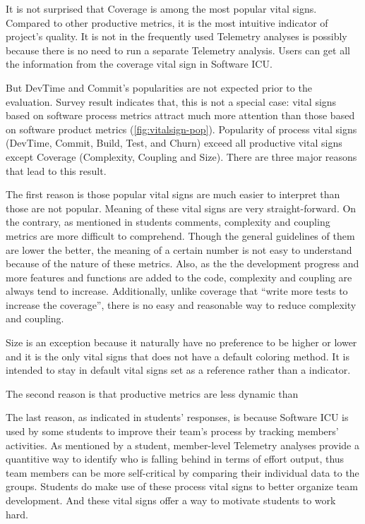 It is not surprised that Coverage is among the most popular vital signs. Compared to other productive metrics, it is the most intuitive indicator of project's quality. It is not in the frequently used Telemetry analyses is possibly because there is no need to run a separate Telemetry analysis. Users can get all the information from the coverage vital sign in Software ICU.

But DevTime and Commit's popularities are not expected prior to the evaluation. Survey result indicates that, this is not a special case: vital signs based on software process metrics attract much more attention than those based on software product metrics (\autoref{fig:vitalsign-pop}). Popularity of process vital signs (DevTime, Commit, Build, Test, and Churn) exceed all productive vital signs except Coverage (Complexity, Coupling and Size). There are three major reasons that lead to this result. 

The first reason is those popular vital signs are much easier to interpret than those are not popular. Meaning of these vital signs are very straight-forward. On the contrary, as mentioned in students comments, complexity and coupling metrics are more difficult to comprehend. Though the general guidelines of them are lower the better, the meaning of a certain number is not easy to understand because of the nature of these metrics. Also, as the the development progress and more features and functions are added to the code, complexity and coupling are always tend to increase. Additionally, unlike coverage that ``write more tests to increase the coverage'', there is no easy and reasonable way to reduce complexity and coupling. 

Size is an exception because it naturally have no preference to be higher or lower and it is the only vital signs that does not have a default coloring method. It is intended to stay in default vital signs set as a reference rather than a indicator.

The second reason is that productive metrics are less dynamic than 

The last reason, as indicated in students' responses, is because Software ICU is used by some students to improve their team's process by tracking members' activities. As mentioned by a student, member-level Telemetry analyses provide a quantitive way to identify who is falling behind in terms of effort output, thus team members can be more self-critical by comparing their individual data to the groups. Students do make use of these process vital signs to better organize team development. And these vital signs offer a way to motivate students to work hard.

